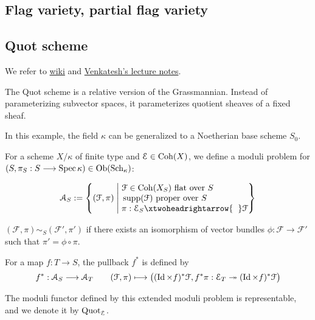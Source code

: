 \subsection{Flag variety, partial flag variety}
\subsection{Quot scheme}
We refer to \href{https://en.wikipedia.org/wiki/Quot_scheme}{wiki} and \href{https://gauss.math.yale.edu/~il282/Siddharth_S16.pdf}{Venkatesh's lecture notes}.

The Quot scheme is a relative version of the Grassmannian. Instead of parameterizing subvector spaces, it parameterizes quotient sheaves of a fixed sheaf.

\begin{eg}
In this example, the field $\kappa$ can be generalized to a Noetherian base scheme $S_0$.

For a scheme $X/\kappa$ of finite type and $\mathcal{E} \in \operatorname{Coh}(X)$, we define a moduli problem for $(S,\pi_S: S \longrightarrow \operatorname{Spec} \kappa) \in \operatorname{Ob}(\operatorname{Sch}_{\kappa})$:

$$\mathcal{A}_S:=\left\{(\mathcal{F},\pi)  \;\middle|\; \begin{aligned}
&\\[-5mm]
&\mathcal{F} \in \Coh(X_S) \text{ flat over $S$ }\\[-1mm]
&\supp(\mathcal{F})  \text{ proper over $S$ }\\[-1mm]
& \pi:\mathcal{E}_S \xtwoheadrightarrow{\hspace{2mm}}  \mathcal{F}
\end{aligned}
 \right\}$$
 
   $(\mathcal{F},\pi) \sim_S (\mathcal{F}',\pi')$ if there exists an isomorphism of vector bundles $\phi:\mathcal{F} \longrightarrow \mathcal{F}'$ such that $\pi'=\phi \circ \pi$.
   
   For a map $f:T \longrightarrow S$, the pullback $f^*$ is defined by
      $$f^*:\mathcal{A}_S \longrightarrow \mathcal{A}_T \qquad (\mathcal{F},\pi) \longmapsto \big((\operatorname{\operatorname{Id}} \times f)^*\mathcal{F},f^* \pi:\mathcal{E}_T \twoheadrightarrow (\operatorname{\operatorname{Id}} \times f)^*\mathcal{F}\big)$$
      
      The moduli functor defined by this extended moduli problem is representable, and we denote it by $\operatorname{Quot}_{\mathcal{E}}$.
\end{eg}

